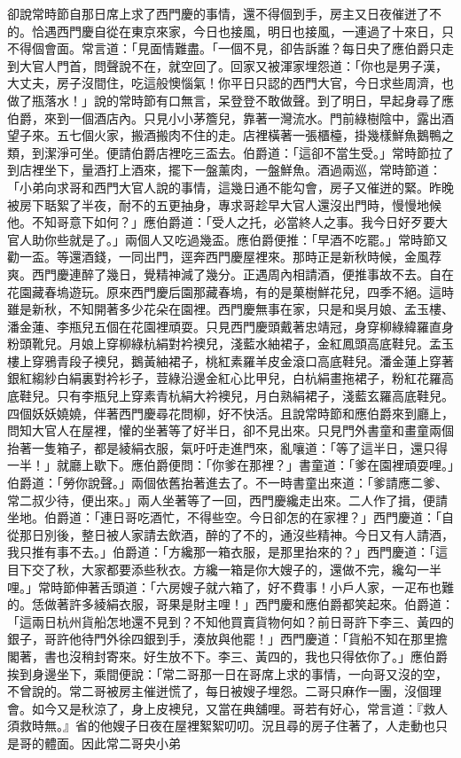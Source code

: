 \begin{showcontents}{}
卻說常時節自那日席上求了西門慶的事情，還不得個到手，房主又日夜催迸了不的。恰遇西門慶自從在東京來家，今日也接風，明日也接風，一連過了十來日，只不得個會面。常言道：「見面情難盡。「一個不見，卻告訴誰？每日央了應伯爵只走到大官人門首，問聲說不在，就空回了。回家又被渾家埋怨道：「你也是男子漢，大丈夫，房子沒間住，吃這般懊惱氣！你平日只認的西門大官，今日求些周濟，也做了瓶落水！」說的常時節有口無言，呆登登不敢做聲。到了明日，早起身尋了應伯爵，來到一個酒店內。只見小小茅簷兒，靠著一灣流水。門前綠樹陰中，露出酒望子來。五七個火家，搬酒搬肉不住的走。店裡橫著一張櫃檯，掛幾樣鮮魚鵝鴨之類，到潔淨可坐。便請伯爵店裡吃三盃去。伯爵道：「這卻不當生受。」常時節拉了到店裡坐下，量酒打上酒來，擺下一盤薰肉，一盤鮮魚。酒過兩巡，常時節道：「小弟向求哥和西門大官人說的事情，這幾日通不能勾會，房子又催迸的緊。昨晚被房下聒絮了半夜，耐不的五更抽身，專求哥趁早大官人還沒出門時，慢慢地候他。不知哥意下如何？」應伯爵道：「受人之托，必當終人之事。我今日好歹要大官人助你些就是了。」兩個人又吃過幾盃。應伯爵便推：「早酒不吃罷。」常時節又勸一盃。等還酒錢，一同出門，逕奔西門慶屋裡來。那時正是新秋時候，金風荐爽。西門慶連醉了幾日，覺精神減了幾分。正遇周內相請酒，便推事故不去。自在花園藏春塢遊玩。原來西門慶后園那藏春塢，有的是菓樹鮮花兒，四季不絕。這時雖是新秋，不知開著多少花朵在園裡。西門慶無事在家，只是和吳月娘、孟玉樓、潘金蓮、李瓶兒五個在花園裡頑耍。只見西門慶頭戴著忠靖冠，身穿柳綠緯羅直身粉頭靴兒。月娘上穿柳綠杭絹對衿襖兒，淺藍水紬裙子，金紅鳳頭高底鞋兒。孟玉樓上穿鴉青段子襖兒，鵝黃紬裙子，桃紅素羅羊皮金滾口高底鞋兒。潘金蓮上穿著銀紅縐紗白絹裏對衿衫子，荳綠沿邊金紅心比甲兒，白杭絹畫拖裙子，粉紅花羅高底鞋兒。只有李瓶兒上穿素青杭絹大衿襖兒，月白熟絹裙子，淺藍玄羅高底鞋兒。四個妖妖嬈嬈，伴著西門慶尋花問柳，好不快活。且說常時節和應伯爵來到廳上，問知大官人在屋裡，懽的坐著等了好半日，卻不見出來。只見門外書童和畫童兩個抬著一隻箱子，都是綾絹衣服，氣吁吁走進門來，亂嚷道：「等了這半日，還只得一半！」就廳上歇下。應伯爵便問：「你爹在那裡？」書童道：「爹在園裡頑耍哩。」伯爵道：「勞你說聲。」兩個依舊抬著進去了。不一時書童出來道：「爹請應二爹、常二叔少待，便出來。」兩人坐著等了一回，西門慶纔走出來。二人作了揖，便請坐地。伯爵道：「連日哥吃酒忙，不得些空。今日卻怎的在家裡？」西門慶道：「自從那日別後，整日被人家請去飲酒，醉的了不的，通沒些精神。今日又有人請酒，我只推有事不去。」伯爵道：「方纔那一箱衣服，是那里抬來的？」西門慶道：「這目下交了秋，大家都要添些秋衣。方纔一箱是你大嫂子的，還做不完，纔勾一半哩。」常時節伸著舌頭道：「六房嫂子就六箱了，好不費事！小戶人家，一疋布也難的。恁做著許多綾絹衣服，哥果是財主哩！」西門慶和應伯爵都笑起來。伯爵道：「這兩日杭州貨船怎地還不見到？不知他買賣貨物何如？前日哥許下李三、黃四的銀子，哥許他待門外徐四銀到手，湊放與他罷！」西門慶道：「貨船不知在那里擔閣著，書也沒稍封寄來。好生放不下。李三、黃四的，我也只得依你了。」應伯爵挨到身邊坐下，乘間便說：「常二哥那一日在哥席上求的事情，一向哥又沒的空，不曾說的。常二哥被房主催迸慌了，每日被嫂子埋怨。二哥只麻作一團，沒個理會。如今又是秋涼了，身上皮襖兒，又當在典舖哩。哥若有好心，常言道：『救人須救時無。』省的他嫂子日夜在屋裡絮絮叨叨。況且尋的房子住著了，人走動也只是哥的體面。因此常二哥央小弟
\end{showcontents}
